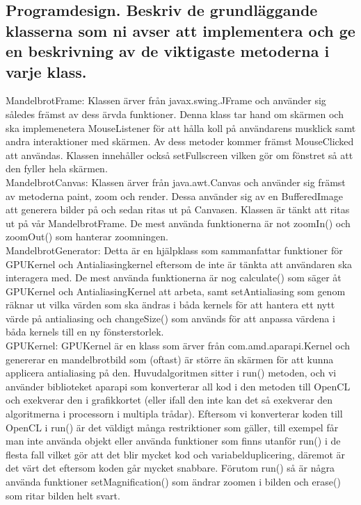 \documentclass[11pt]{article} %
\begin{document}
\subsection{Programdesign. Beskriv de grundläggande klasserna som ni avser att implementera och ge en beskrivning av de viktigaste metoderna i varje klass.}

MandelbrotFrame: Klassen ärver från javax.swing.JFrame och använder sig således främst av dess ärvda funktioner. Denna klass tar hand om skärmen och ska implemenetera MouseListener för att hålla koll på användarens musklick samt andra interaktioner med skärmen. Av dess metoder kommer främst MouseClicked att användas. Klassen innehåller också setFullscreen vilken gör om fönstret så att den fyller hela skärmen. \\

MandelbrotCanvas: Klassen ärver från java.awt.Canvas och använder sig främst av metoderna paint, zoom och render. Dessa använder sig av en BufferedImage att generera bilder på och sedan ritas ut på Canvasen. Klassen är tänkt att ritas ut på vår MandelbrotFrame. De mest använda funktionerna är not zoomIn() och zoomOut() som hanterar zoomningen. \\

MandelbrotGenerator: Detta är en hjälpklass som sammanfattar funktioner för GPUKernel och Antialiasingkernel eftersom de inte är tänkta att användaren ska interagera med. De mest använda funktionerna är nog calculate() som säger åt GPUKernel och AntialiasingKernel att arbeta, samt setAntialiasing som genom räknar ut vilka värden som ska ändras i båda kernels för att hantera ett nytt värde på antialiasing och changeSize() som används för att anpassa värdena i båda kernels till en ny fönsterstorlek. \\

GPUKernel: GPUKernel är en klass som ärver från com.amd.aparapi.Kernel och genererar en mandelbrotbild som (oftast) är större än skärmen för att kunna applicera antialiasing på den. Huvudalgoritmen sitter i run() metoden, och vi använder biblioteket aparapi som konverterar all kod i den metoden till OpenCL och exekverar den i grafikkortet (eller ifall den inte kan det så exekverar den algoritmerna i processorn i multipla trådar). Eftersom vi konverterar koden till OpenCL i run() är det väldigt många restriktioner som gäller, till exempel får man inte använda objekt eller använda funktioner som finns utanför run() i de flesta fall vilket gör att det blir mycket kod och variabelduplicering, däremot är det värt det eftersom koden går mycket snabbare. Förutom run() så är några använda funktioner setMagnification() som ändrar zoomen i bilden och erase() som ritar bilden helt svart. \\
\end{document}
